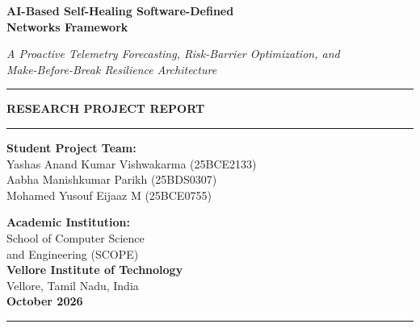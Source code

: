 \documentclass[11pt,a4paper]{report}
\begin{document}
\begin{titlepage}
\centering
\vspace*{1.5cm}

{\huge \bfseries AI-Based Self-Healing Software-Defined\\[0.3em] Networks Framework \par}
\vspace{0.8cm}
{\large \itshape A Proactive Telemetry Forecasting, Risk-Barrier Optimization, and\\[0.2em] Make-Before-Break Resilience Architecture \par}

\vspace{2.5cm}

\noindent\rule{\linewidth}{1.2pt}

\vspace{1.2cm}

{\Large \bfseries RESEARCH PROJECT REPORT \par}

\vspace{1.2cm}

\noindent\rule{\linewidth}{1.2pt}

\vfill

\begin{minipage}[t]{0.52\textwidth}
\raggedright
\textbf{Student Project Team:}\\[0.4em]
Yashas Anand Kumar Vishwakarma (25BCE2133)\\[0.2em]
Aabha Manishkumar Parikh (25BDS0307)\\[0.2em]
Mohamed Yusouf Eijaaz M (25BCE0755)
\end{minipage}%
\hfill
\begin{minipage}[t]{0.44\textwidth}
\raggedleft
\textbf{Academic Institution:}\\[0.4em]
School of Computer Science\\
and Engineering (SCOPE)\\[0.3em]
\textbf{Vellore Institute of Technology}\\
Vellore, Tamil Nadu, India\\[0.5em]
\textbf{October 2026}
\end{minipage}

\vspace{1.5cm}

\noindent\rule{\linewidth}{1.2pt}

\end{titlepage}
\end{document}
